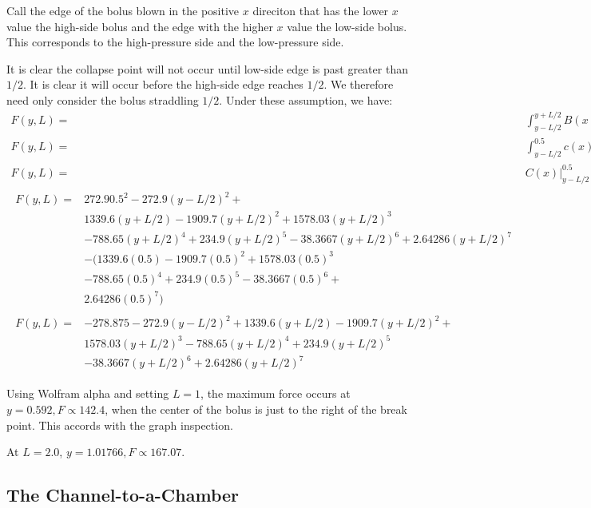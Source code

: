 \documentclass[]{asme2ej}
\begin{document}
Call the edge of the bolus blown in the positive $x$ direciton that has the lower $x$ value the high-side bolus and the edge with the higher $x$ value the low-side bolus.
This corresponds to the high-pressure side and the low-pressure side.

It is clear the collapse point will not occur until low-side edge is past greater than $1/2$. It is clear it will occur before the high-side edge reaches $1/2$. We therefore need only consider the bolus straddling
$1/2$.
Under these assumption, we have:
\begin{align}
  F(y,L) = & \int_{y-L/2}^{y+L/2} B(x) dx \\
  F(y,L) = & \int_{y-L/2}^{0.5} c(x) dx  + \int_{0.5}^{y+L/2} q(x) dx   \\
  F(y,L) = & C(x) \bigg\rvert_{y-L/2}^{0.5}   +  Q(x) \bigg\rvert_{0.5}^{y+L/2} \\
  \begin{split}
  F(y,L) = & 272.9 0.5^2 - 272.9 (y-L/2)^2 + \\
  & 1339.6 (y+L/2) - 1909.7 (y+L/2)^2 + 1578.03 (y+L/2)^3 \\
  & - 788.65 (y+L/2)^4 + 234.9 (y+L/2)^5 - 38.3667 (y+L/2)^6 + 2.64286 (y+L/2)^7 \\
  & -(  1339.6 (0.5) - 1909.7 (0.5)^2 + 1578.03 (0.5)^3 \\
  & - 788.65 (0.5)^4 + 234.9 (0.5)^5 - 38.3667 (0.5)^6 + \\
  & 2.64286 (0.5)^7)
  \end{split} \\
  \begin{split}
  F(y,L) = & -278.875 - 272.9 (y-L/2)^2 + 1339.6 (y+L/2) - 1909.7 (y+L/2)^2 + \\
  & 1578.03 (y+L/2)^3 - 788.65 (y+L/2)^4 + 234.9 (y+L/2)^5 \\
  & - 38.3667 (y+L/2)^6 + 2.64286 (y+L/2)^7
  \end{split}
    \label{eq:force}
\end{align}

Using Wolfram alpha and setting $L = 1$, the maximum force occurs
at $y = 0.592, F \propto 142.4 $, when the center of the bolus is just to the right
of the break point. This accords with the graph inspection.

At $L = 2.0$, $y = 1.01766, F \propto 167.07$.


\subsection{The Channel-to-a-Chamber}
\end{document}
